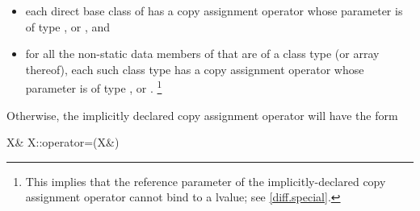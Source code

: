 \documentclass[american]{book}
\begin{document}
\begin{itemize}
\item
each direct base class
of
has a copy assignment operator whose parameter is of type
,
or
,
and
\item
for all the non-static data members of
that are of a class type
(or array thereof),
each such class type has a copy assignment operator whose parameter is of type
,
or
.%
\footnote{
This implies that the reference parameter of the
implicitly-declared copy assignment operator cannot bind to a
lvalue; see \ref{diff.special}.
}
\end{itemize}

Otherwise, the implicitly declared copy
assignment operator
will have the form

\begin{codeblock}
X& X::operator=(X&)
\end{codeblock}
\end{document}
